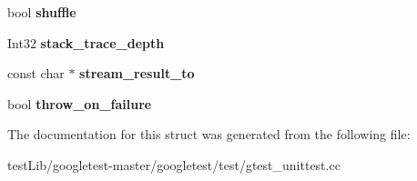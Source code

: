 \begin{DoxyCompactItemize}
bool {\bfseries shuffle}
\item 
\mbox{\label{structtesting_1_1Flags_a20c6592453909c1adace64bf6a2bc2de}} 
Int32 {\bfseries stack\+\_\+trace\+\_\+depth}
\item 
\mbox{\label{structtesting_1_1Flags_ab09849fd3e095d5628dec65ec4dce9e1}} 
const char $\ast$ {\bfseries stream\+\_\+result\+\_\+to}
\item 
\mbox{\label{structtesting_1_1Flags_ab8e7d21e31e641efe47b8050759e001a}} 
bool {\bfseries throw\+\_\+on\+\_\+failure}
\end{DoxyCompactItemize}


The documentation for this struct was generated from the following file\+:\begin{DoxyCompactItemize}
\item 
test\+Lib/googletest-\/master/googletest/test/gtest\+\_\+unittest.\+cc\end{DoxyCompactItemize}
